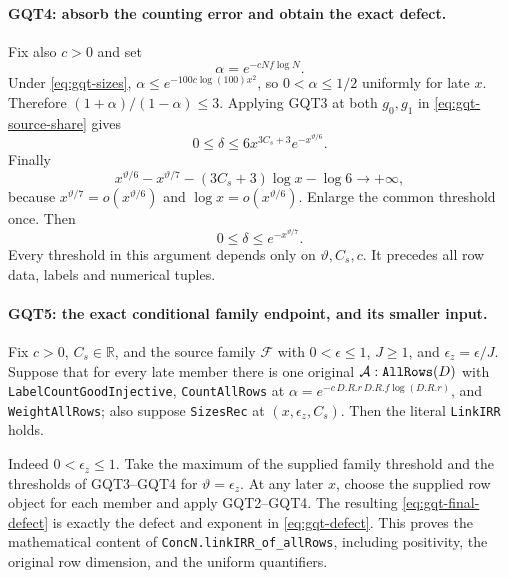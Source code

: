 \documentclass[11pt,a4paper]{article}
\numberwithin{equation}{section}
\theoremstyle{remark}\newtheorem{remark}[theorem]{Remark}
\begin{document}
\paragraph{GQT4: absorb the counting error and obtain the exact defect.}
\label{claim:GQT4}
Fix also $c>0$ and set
\[
                 \alpha=e^{-cNf\log N}.
\]
Under \eqref{eq:gqt-sizes},
$\alpha\le e^{-100c\log(100)x^2}$, so $0<\alpha\le1/2$
uniformly for late $x$. Therefore
$(1+\alpha)/(1-\alpha)\le3$. Applying GQT3 at both $g_0,\allowbreak{} g_1$
in \eqref{eq:gqt-source-share} gives
\[
          0\le\delta\le6x^{3C_s+3}e^{-x^{\vartheta/6}}.
\]
Finally
\[
 x^{\vartheta/6}-x^{\vartheta/7}
                   -(3C_s+3)\log x-\log6\longrightarrow+\infty,
\]
because $x^{\vartheta/7}=o(x^{\vartheta/6})$ and
$\log x=o(x^{\vartheta/6})$. Enlarge the common threshold once.
Then
\begin{equation}\label{eq:gqt-final-defect}
                         0\le\delta\le e^{-x^{\vartheta/7}}.
\end{equation}
Every threshold in this argument depends only on $\vartheta,\allowbreak{} C_s,\allowbreak{} c$.
It precedes all row data, labels and numerical tuples.

\paragraph{GQT5: the exact conditional family endpoint, and its smaller input.}
\label{claim:GQT5}
Fix $c>0$, $C_s\in\mathbb R$, and the source family $\mathcal F$
with $0<\epsilon\le1$,
$J\ge1$, and $\epsilon_z=\epsilon/J$. Suppose that for every late
member there is one original $\mathcal A:\texttt{All\allowbreak Rows}(D)$ with
\texttt{Label\allowbreak Count\allowbreak Good\allowbreak Injective}, \texttt{Count\allowbreak All\allowbreak Rows} at
$\alpha=e^{-c\,\allowbreak{} D.R.r\,\allowbreak{} D.R.f\log(D.R.r)}$, and
\texttt{Weight\allowbreak All\allowbreak Rows}; also suppose \texttt{Sizes\allowbreak Rec} at
$(x,\epsilon_z,\allowbreak{} C_s)$. Then the literal \texttt{Link\allowbreak IRR} holds.

Indeed $0<\epsilon_z\le1$. Take the maximum of the supplied
family threshold and the thresholds of GQT3--GQT4 for
$\vartheta=\epsilon_z$. At any later $x$, choose the supplied
row object for each member and apply GQT2--GQT4. The resulting
\eqref{eq:gqt-final-defect} is exactly the defect and exponent
in \eqref{eq:gqt-defect}. This proves the mathematical content
of \texttt{Conc\allowbreak N.\allowbreak link\allowbreak IRR\_\allowbreak of\_\allowbreak all\allowbreak Rows}, including positivity,
the original row dimension, and the uniform quantifiers.
\end{document}
